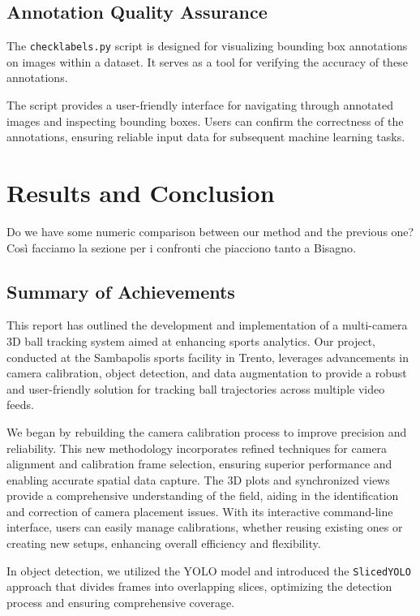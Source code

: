 \documentclass{template}
\begin{document}
\section{Annotation Quality Assurance}

The \texttt{checklabels.py} script is designed for visualizing bounding box annotations on images within a dataset. 
It serves as a tool for verifying the accuracy of these annotations.

The script provides a user-friendly interface for navigating through annotated images and inspecting bounding boxes.
Users can confirm the correctness of the annotations, ensuring reliable input data for subsequent machine learning tasks.

\chapter{Results and Conclusion}

Do we have some numeric comparison between our method and the previous one? Così facciamo la sezione per i confronti che piacciono tanto a Bisagno.
\cite{gulawani2006cfd}

\section{Summary of Achievements}
This report has outlined the development and implementation of a multi-camera 3D ball tracking system aimed at enhancing sports analytics. Our project, conducted at the Sambapolis sports facility in Trento, leverages advancements in camera calibration, object detection, and data augmentation to provide a robust and user-friendly solution for tracking ball trajectories across multiple video feeds.

We began by rebuilding the camera calibration process to improve precision and reliability. This new methodology incorporates refined techniques for camera alignment and calibration frame selection, ensuring superior performance and enabling accurate spatial data capture. 
The 3D plots and synchronized views provide a comprehensive understanding of the field, aiding in the identification and correction of camera placement issues. With its interactive command-line interface, users can easily manage calibrations, whether reusing existing ones or creating new setups, enhancing overall efficiency and flexibility.

In object detection, we utilized the YOLO model and introduced the \texttt{SlicedYOLO} approach that divides frames into overlapping slices, optimizing the detection process and ensuring comprehensive coverage. 
\end{document}
